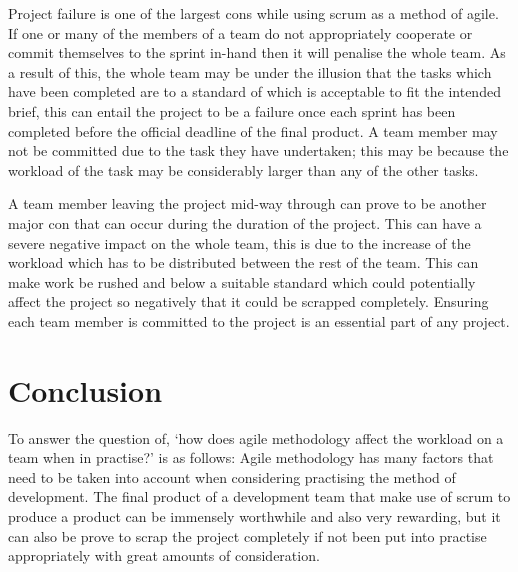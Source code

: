 \documentclass{scrartcl}
\begin{document}
Project failure is one of the largest cons while using scrum as a method of agile. If one or many of the members of a team do not appropriately cooperate or commit themselves to the sprint in-hand then it will penalise the whole team. As a result of this, the whole team may be under the illusion that the tasks which have been completed are to a standard of which is acceptable to fit the intended brief, this can entail the project to be a failure once each sprint has been completed before the official deadline of the final product. A team member may not be committed due to the task they have undertaken; this may be because the workload of the task may be considerably larger than any of the other tasks.
 
A team member leaving the project mid-way through can prove to be another major con that can occur during the duration of the project. This can have a severe negative impact on the whole team, this is due to the increase of the workload which has to be distributed between the rest of the team. This can make work be rushed and below a suitable standard which could potentially affect the project so negatively that it could be scrapped completely. Ensuring each team member is committed to the project is an essential part of any project. 

\section{Conclusion}
To answer the question of, ‘how does agile methodology affect the workload on a team when in practise?’ is as follows: Agile methodology has many factors that need to be taken into account when considering practising the method of development. The final product of a development team that make use of scrum to produce a product can be immensely worthwhile and also very rewarding, but it can also be prove to scrap the project completely if not been put into practise appropriately with great amounts of consideration. 





\end{document}
